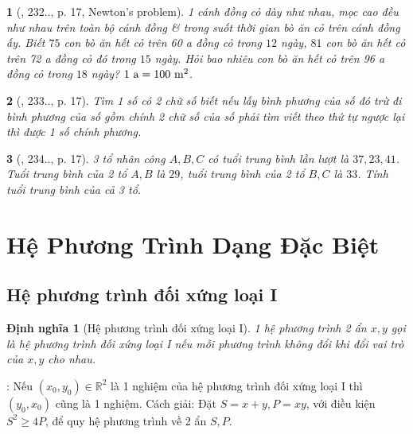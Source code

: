 \documentclass{article}
\newtheorem{baitoan}{}
\newtheorem{dinhnghia}{Định nghĩa}
\begin{document}
\begin{baitoan}[\cite{Binh_Toan_9_tap_2}, 232.., p. 17, Newton's problem]
	1 cánh đồng cỏ dày như nhau, mọc cao đều như nhau trên toàn bộ cánh đồng \& trong suốt thời gian bò ăn cỏ trên cánh đồng ấy. Biết $75$ con bò ăn hết cỏ trên {\rm60 a} đồng cỏ trong $12$ ngày, $81$ con bò ăn hết cỏ trên {\rm72 a} đồng cỏ đó trong $15$ ngày. Hỏi bao nhiêu con bò ăn hết cỏ trên {\rm96 a} đồng cỏ trong $18$ ngày? $\rm1\ a = 100\ m^2$.
\end{baitoan}

\begin{baitoan}[\cite{Binh_Toan_9_tap_2}, 233.., p. 17]
	Tìm 1 số có 2 chữ số biết nếu lấy bình phương của số đó trừ đi bình phương của số gồm chính 2 chữ số của số phải tìm viết theo thứ tự ngược lại thì được 1 số chính phương.
\end{baitoan}

\begin{baitoan}[\cite{Binh_Toan_9_tap_2}, 234.., p. 17]
	3 tổ nhân công $A,B,C$ có tuổi trung bình lần lượt là $37,23,41$. Tuổi trung bình của 2 tổ $A,B$ là $29$, tuổi trung bình của 2 tổ $B,C$ là $33$. Tính tuổi trung bình của cả 3 tổ.
\end{baitoan}


\section{Hệ Phương Trình Dạng Đặc Biệt}

\subsection{Hệ phương trình đối xứng loại I}

\begin{dinhnghia}[Hệ phương trình đối xứng loại I]
	1 hệ phương trình 2 ẩn $x,y$ gọi là {hệ phương trình đối xứng loại I} nếu mỗi phương trình không đổi khi đổi vai trò của $x,y$ cho nhau.
\end{dinhnghia}
: Nếu $(x_0,y_0)\in\mathbb{R}^2$ là 1 nghiệm của hệ phương trình đối xứng loại I thì $(y_0,x_0)$ cũng là 1 nghiệm. {\sf Cách giải}: Đặt $S = x + y,P = xy$, với điều kiện $S^2\ge4P$, để quy hệ phương trình về 2 ẩn $S,P$.
\end{document}
